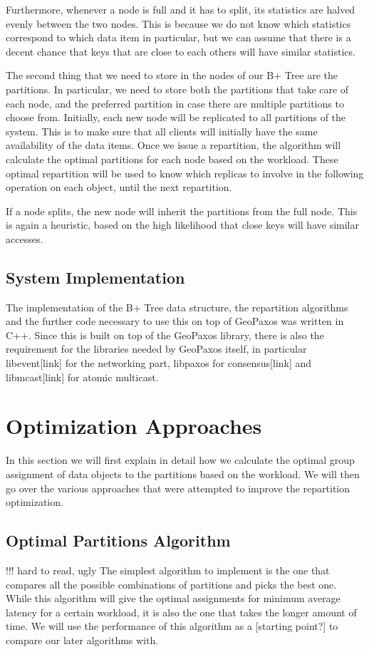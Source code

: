 Furthermore, whenever a node is full and it has to split, its statistics are halved evenly between the two nodes. This is because we do not know which statistics correspond to which data item in particular, but we can assume that there is a decent chance that keys that are close to each others will have similar statistics.

The second thing that we need to store in the nodes of our B+ Tree are the partitions. In particular, we need to store both the partitions that take care of each node, and the preferred partition in case there are multiple partitions to choose from. Initially, each new node will be replicated to all partitions of the system. This is to make sure that all clients will initially have the same availability of the data items. Once we issue a repartition, the algorithm will calculate the optimal partitions for each node based on the workload. These optimal repartition will be used to know which replicas to involve in the following operation on each object, until the next repartition. 

If a node splits, the new node will inherit the partitions from the full node. This is again a heuristic, based on the high likelihood that close keys will have similar accesses.

\subsection{System Implementation}\label{sec:system-implementation}
The implementation of the B+ Tree data structure, the repartition algorithms and the further code necessary to use this on top of GeoPaxos was written in C++. Since this is built on top of the GeoPaxos library, there is also the requirement for the libraries needed by GeoPaxos itself, in particular libevent[link] for the networking part, libpaxos for consensus[link] and libmcast[link] for atomic multicast.

\section{Optimization Approaches}\label{sec:optimization-approaches}
In this section we will first explain in detail how we calculate the optimal group assignment of data objects to the partitions based on the workload. We will then go over the various approaches that were attempted to improve the repartition optimization. 

\subsection{Optimal Partitions Algorithm}\label{sec:optimal-partitions-algorithm} 
!!! hard to read, ugly
The simplest algorithm to implement is the one that compares all the possible combinations of partitions and picks the best one. While this algorithm will give the optimal assignments for minimum average latency for a certain workload, it is also the one that takes the longer amount of time. We will use the performance of this algorithm as a [starting point?] to compare our later algorithms with.

